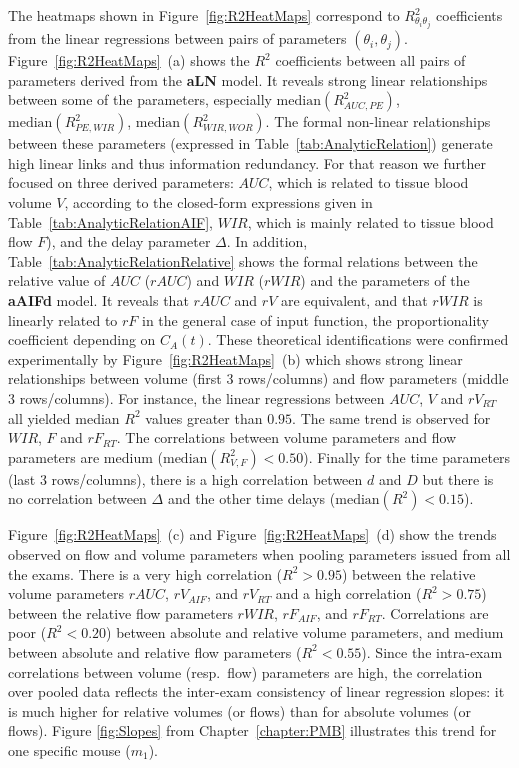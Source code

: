 The heatmaps shown in Figure~\ref{fig:R2HeatMaps} correspond to $R^2_{\theta_{i}\theta_{j}}$ coefficients from the linear regressions between pairs of parameters $\left(\theta_{i}, \theta_{j}\right)$. Figure~\ref{fig:R2HeatMaps}~(a) shows the $R^2$ coefficients between all pairs of parameters derived from the \textbf{aLN} model. It reveals strong linear relationships between some of the parameters, especially $\mathrm{median}\left(R^2_{AUC, PE}\right)$, $\mathrm{median}\left(R^2_{PE, WIR}\right)$, $\mathrm{median}\left(R^2_{WIR, WOR}\right)$. The formal non-linear relationships between these parameters (expressed in Table~\ref{tab:AnalyticRelation}) generate high linear links and thus information redundancy. For that reason we further focused on three derived parameters: $AUC$, which is related to tissue blood volume $V$, according to the closed-form expressions given in Table~\ref{tab:AnalyticRelationAIF}, $WIR$, which is mainly related to tissue blood flow $F$), and the delay parameter $\Delta$. In addition, Table~\ref{tab:AnalyticRelationRelative} shows the formal relations between the relative value of $AUC$ ($rAUC$) and $WIR$ ($rWIR$) and the parameters of the \textbf{aAIFd} model. It reveals that $rAUC$ and $rV$ are equivalent, and that $rWIR$ is linearly related to $rF$ in the general case of input function, the proportionality coefficient depending on $C_A\left(t\right)$. These theoretical identifications were confirmed experimentally by Figure~\ref{fig:R2HeatMaps}~(b) which shows strong linear relationships between volume (first 3 rows/columns) and flow parameters (middle 3 rows/columns). For instance, the linear regressions between $AUC$, $V$ and $rV_{RT}$ all yielded median $R^2$ values greater than $0.95$. The same trend is observed for $WIR$, $F$ and $rF_{RT}$. The correlations between volume parameters and flow parameters are medium ($\mathrm{median}\left(R^2_{V, F}\right) < 0.50$). Finally for the time parameters (last 3 rows/columns), there is a high correlation between $d$ and $D$ but there is no correlation between $\Delta$ and the other time delays ($\mathrm{median}\left(R^2\right) < 0.15$). 

Figure~\ref{fig:R2HeatMaps}~(c) and Figure~\ref{fig:R2HeatMaps}~(d) show the trends observed on flow and volume parameters when pooling parameters issued from all the exams. 
There is a very high correlation ($R^2 > 0.95$) between the relative volume parameters $rAUC$, $rV_{AIF}$, and $rV_{RT}$ and a high correlation ($R^2 > 0.75$) between the relative flow parameters $rWIR$, $rF_{AIF}$, and $rF_{RT}$. Correlations are poor ($R^2 < 0.20$) between absolute and relative volume parameters, and medium between absolute and relative flow parameters ($R^2< 0.55$). Since the intra-exam correlations between volume (resp.~flow) parameters are high, the correlation over pooled data reflects the inter-exam consistency of linear regression slopes: it is much higher for relative volumes (or flows) than for absolute volumes (or flows). Figure \ref{fig:Slopes} from Chapter~\ref{chapter:PMB} illustrates this trend for one specific mouse ($m_1$). 
\FloatBarrier



